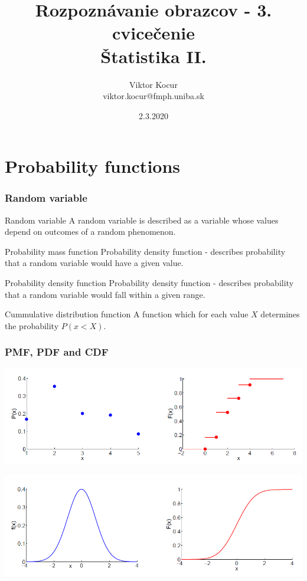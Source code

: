 \documentclass{beamer}
\title[Príznaky]{Rozpoznávanie obrazcov - 3. cvicečenie \\ Štatistika II.}
\author[Viktor Kocur]{Viktor Kocur \\{\small viktor.kocur@fmph.uniba.sk}}
\institute{DAI FMFI UK}
\date{2.3.2020}
\begin{document}

\begin{frame}[plain]
  \titlepage  
\end{frame}

\section{Probability functions}

\begin{frame}
\frametitle{Random variable}

\begin{block}{Random variable}
A random variable is described as a variable whose values depend on outcomes of a random phenomenon.
\end{block}

\begin{block}{Probability mass function}
Probability density function - describes probability that a random variable would have a given value.
\end{block}

\begin{block}{Probability density function}
Probability density function - describes probability that a random variable would fall within a given range.
\end{block}

\begin{block}{Cummulative distribution function}
A function which for each value $X$ determines the probability $P(x < X)$.
\end{block}

\end{frame}

\begin{frame}
\frametitle{PMF, PDF and CDF}

\includegraphics[width=\textwidth]{df1.png}

\includegraphics[width=\textwidth]{df2.png}
\end{frame}
\end{document}
